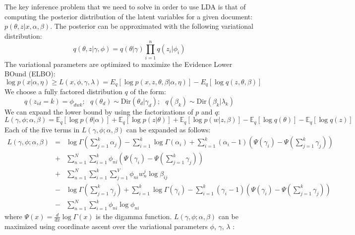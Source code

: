 The key inference problem that we need to solve in order to use LDA is that of computing the posterior distribution of the latent variables for a given document: $p(\theta,z|x,\alpha,\beta)$. The posterior can be approximated with the following variational distribution:
\begin{equation}
    q(\theta,z|\gamma, \phi) = q(\theta|\gamma) \prod_{i=1}^{n}q(z_i|\phi_i)
\end{equation}
The variational parameters are optimized to maximize the Evidence Lower BOund (ELBO):
\begin{equation}
    \log p(x|\alpha,\eta) \geq L(x,\phi,\gamma,\lambda) = E_q[\log p(x,z,\theta,\beta|\alpha, \eta)] - E_q[\log q(z,\theta,\beta)] 
\end{equation}
We choose a fully factored distribution $q$ of the form:
\begin{equation}
    q(z_{id}=k)=\phi_{dwk}; ~~~ q(\theta_d) \sim \mathrm{Dir}(\theta_d|\gamma_d); ~~~ q(\beta_k) \sim \mathrm{Dir}(\beta_k|\lambda_k)
\end{equation}
We can expand the lower bound by using the factorizations of $p$ and $q$:
\begin{equation*}\label{equ:var1}
L(\gamma, \phi; \alpha, \beta) = \mathbb{E}_q [\log p(\theta|\alpha)] + \mathbb{E}_q [\log p(z|\theta)] + \mathbb{E}_q [\log p(w|z,\beta)] - \mathbb{E}_q[\log q(\theta)] - \mathbb{E}_q[\log q(z)]
\end{equation*}
Each of the five terms in $L(\gamma, \phi; \alpha, \beta)$ can be expanded \cite{Blei2003} as follows:
\begin{eqnarray}\label{equ:var2}
 L(\gamma, \phi; \alpha, \beta) &=& \log \Gamma(\sum_{j=1}^{k}\alpha_j) - \sum_{i=1}^{k}\log \Gamma(\alpha_i) + \sum_{i=1}^{k}(\alpha_i-1)(\Psi(\gamma_i)-\Psi(\sum_{j=1}^{k}\gamma_j)) \\
 &+& \sum_{n=1}^{N}\sum_{i=1}^{k}\phi_{ni}(\Psi(\gamma_i)-\Psi(\sum_{j=1}^{k}\gamma_j)) \\
 &+& \sum_{n=1}^{N}\sum_{i=1}^{k}\sum_{j=1}^{V}\phi_{ni}w_{n}^{j}\log \beta_{ij} \\
 &-& \log \Gamma(\sum_{j=1}^{k}\gamma_j) + \sum_{i=1}^{k}\log \Gamma(\gamma_i) - \sum_{i=1}^{k}(\gamma_i-1)(\Psi(\gamma_i)-\Psi(\sum_{j=1}^{k}\gamma_j)) \\
 &-& \sum_{n=1}^{N}\sum_{i=1}^{k}\phi_{ni}\log \phi_{ni} 
\end{eqnarray}
where $\Psi(x)=\frac{d}{dx}\log \Gamma(x)$ is the digamma function. $L(\gamma,\phi;\alpha,\beta)$ can be maximized using coordinate ascent over the variational parameters $\phi$, $\gamma$, $\lambda$ \cite{Blei2003}:

